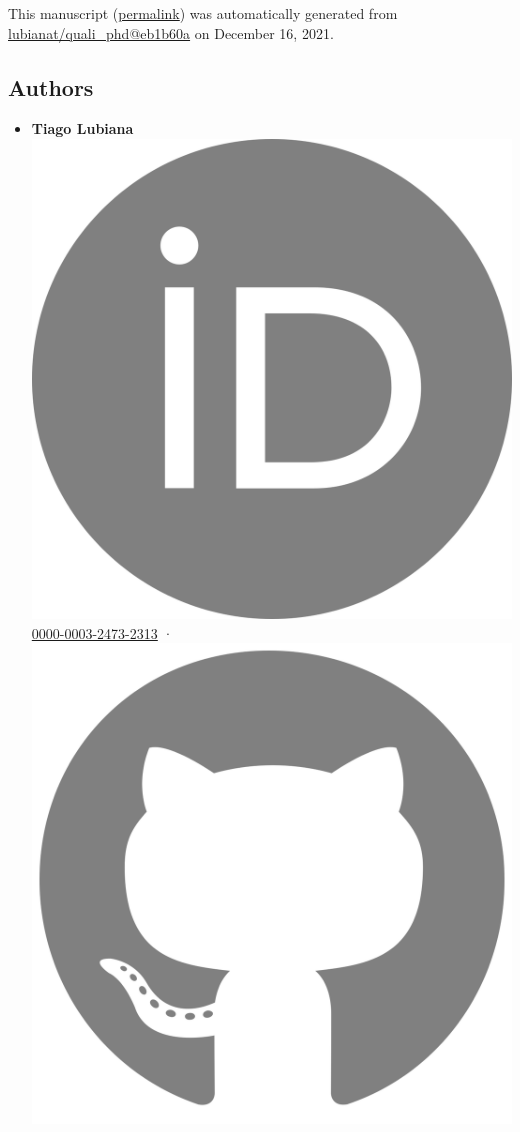 This manuscript
(\href{https://lubianat.github.io/quali_phd/v/eb1b60a057886c60a568ad9586443de700dd0c32/}{permalink})
was automatically generated
from \href{https://github.com/lubianat/quali_phd/tree/eb1b60a057886c60a568ad9586443de700dd0c32}{lubianat/quali\_phd@eb1b60a}
on December 16, 2021.

\hypertarget{authors}{%
\subsection{Authors}\label{authors}}

\begin{itemize}
\tightlist
\item
  \textbf{Tiago Lubiana}
  \includegraphics[width=0.85\columnwidth]{images/orcid.svg.png}
  \href{https://orcid.org/0000-0003-2473-2313}{0000-0003-2473-2313}
  · \includegraphics[width=0.85\columnwidth]{images/github.svg.png}

\end{itemize}
